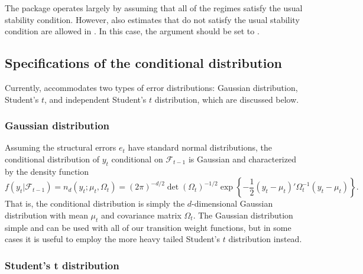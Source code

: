 \documentclass[nojss]{jss}
\begin{document}
The  package  operates largely by assuming that all of the regimes satisfy the usual stability condition. However, also estimates that do not satisfy the usual stability condition are allowed in . In this case, the argument  should be set to .


\subsection{Specifications of the conditional distribution}\label{sec:cond_dist}

Currently,  accommodates two types of error distributions: Gaussian distribution, Student's $t$, and independent Student's $t$ distribution, which are discussed below.

\subsubsection{Gaussian distribution}

Assuming the structural errors $e_t$ have standard normal distributions, the conditional distribution of $y_t$ conditional on $\mathcal{F}_{t-1}$ is Gaussian and characterized by the density function
\begin{equation}
f(y_t|\mathcal{F}_{t-1}) = n_d(y_t;\mu_{t},\Omega_{t})=(2\pi)^{-d/2}\det(\Omega_t)^{-1/2}\exp\left\lbrace -\frac{1}{2}(y_t - \mu_t)'\Omega_t^{-1}(y_t - \mu_t) \right\rbrace .
\end{equation}
That is, the conditional distribution is simply the $d$-dimensional Gaussian distribution with mean $\mu_t$ and covariance matrix $\Omega_t$. The Gaussian distribution simple and can be used with all of our transition weight functions, but in some cases it is useful to employ the more heavy tailed Student's $t$ distribution instead.

\subsubsection{Student's t distribution}\label{sec:student}
\end{document}
